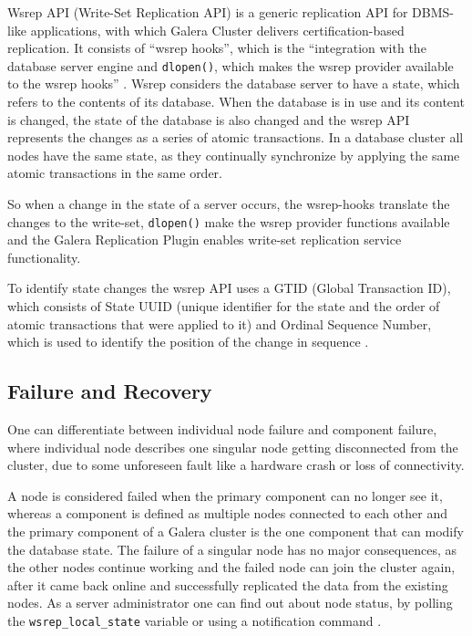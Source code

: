 \documentclass{sig-alternate}
\begin{document}
Wsrep API (Write-Set Replication API) is a generic replication API for DBMS-like applications, with which Galera Cluster delivers certification-based replication. It consists of ``wsrep hooks'', which is the ``integration with the database server engine and \texttt{dlopen()}, which makes the wsrep provider available to the wsrep hooks'' \cite{wsrepapi}. Wsrep considers the database server to have a state, which refers to the contents of its database. When the database is in use and its content is changed, the state of the database is also changed and the wsrep API represents the changes as a series of atomic transactions. In a database cluster all nodes have the same state, as they continually synchronize by applying the same atomic transactions in the same order.

So when a change in the state of a server occurs, the wsrep-hooks translate the changes to the write-set, \texttt{dlopen()} make the wsrep provider functions available and the Galera Replication Plugin enables write-set replication service functionality.

To identify state changes the wsrep API uses a GTID (Global Transaction ID), which consists of State UUID (unique identifier for the state and the order of atomic transactions that were applied to it) and Ordinal Sequence Number, which is used to identify the position of the change in sequence \cite{wsrepapi}.

\subsection{Failure and Recovery}

One can differentiate between individual node failure and component failure, where individual node describes one singular node getting disconnected from the cluster, due to some unforeseen fault like a hardware crash or loss of connectivity.

A node is considered failed when the primary component can no longer see it, whereas a component is defined as multiple nodes connected to each other and the primary component of a Galera cluster is the one component that can modify the database state. The failure of a singular node has no major consequences, as the other nodes continue working and the failed node can join the cluster again, after it came back online and successfully replicated the data from the existing nodes. As a server administrator one can find out about node status, by polling the \texttt{wsrep\_local\_state} variable or using a notification command \cite{galerarecovery}.
\end{document}

